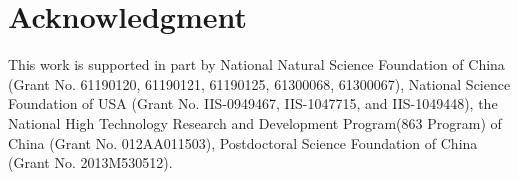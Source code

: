\documentclass[journal]{IEEEtran}
\begin{document}

%
%
%
%


\section*{Acknowledgment}
This work is supported in part by National Natural Science Foundation of China (Grant No. 61190120, 61190121, 61190125, 61300068, 61300067), National Science Foundation of USA (Grant No. IIS-0949467, IIS-1047715, and IIS-1049448), the National High Technology Research and Development Program(863 Program) of China (Grant No. 012AA011503), Postdoctoral Science Foundation of China (Grant No. 2013M530512).


\ifCLASSOPTIONcaptionsoff
  \newpage
\fi
\end{document}
